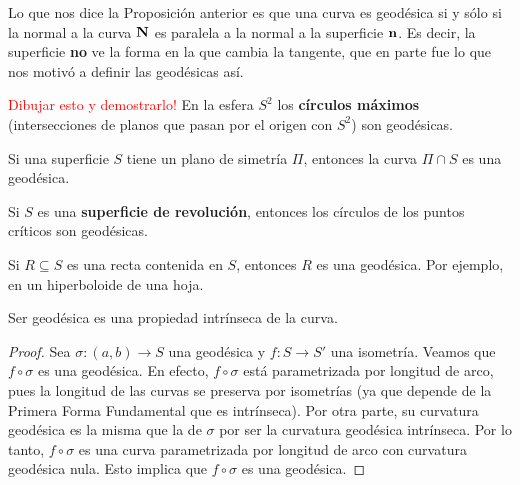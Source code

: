 \begin{obs}
Lo que nos dice la Proposición anterior es que una curva es geodésica si y sólo si la normal a la curva $\operatorname{\mathbf{N}}$ es paralela a la normal a la superficie $\operatorname{\mathbf{n}}$. Es decir, la superficie \textbf{no} ve la forma en la que cambia la tangente, que en parte fue lo que nos motivó a definir las geodésicas así.
\end{obs}

\begin{ex}\textcolor{red}{Dibujar esto y demostrarlo!}
En la esfera $S^2$ los \textbf{círculos máximos} (intersecciones de planos que pasan por el origen con $S^2$) son geodésicas.

Si una superficie $S$ tiene un plano de simetría $\Pi$, entonces la curva $\Pi\cap S$ es una geodésica.

Si $S$ es una \textbf{superficie de revolución}, entonces los círculos de los puntos críticos son geodésicas.

Si $R\subseteq S$ es una recta contenida en $S$, entonces $R$ es una geodésica. Por ejemplo, en un hiperboloide de una hoja.
\end{ex}

\begin{prop}
Ser geodésica es una propiedad intrínseca de la curva.
\begin{proof}
Sea $\sigma:(a,b)\to S$ una geodésica y $f:S\to S'$ una isometría. Veamos que $f\circ\sigma$ es una geodésica. En efecto, $f\circ\sigma$ está parametrizada por longitud de arco, pues la longitud de las curvas se preserva por isometrías (ya que depende de la Primera Forma Fundamental que es intrínseca). Por otra parte, su curvatura geodésica es la misma que la de $\sigma$ por ser la curvatura geodésica intrínseca. Por lo tanto, $f\circ\sigma$ es una curva parametrizada por longitud de arco con curvatura geodésica nula. Esto implica que $f\circ\sigma$ es una geodésica.
\end{proof}
\end{prop}
